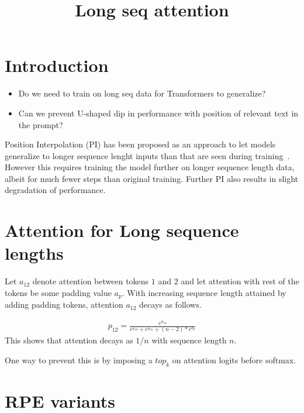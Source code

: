 \title{Long seq attention}



\maketitle

\newcommand{\cy}[1]{\textcolor{red}{ [{\em CY:} #1]}}
\newcommand{\TODO}[1]{\todo[size=\tiny]{#1}}
\newcommand{\todoInline}[1]{{\color{red}{\bf[TODO: #1]}}} 

\todoInline{Metrics for  locality bias?}
\todoInline{Difference between T5Rel and MLPRPE?}
\section{Introduction}

\begin{itemize}
    \item Do we need to train on long seq data for Transformers to generalize?
\item Can we prevent U-shaped dip in performance with position of relevant text in the prompt?
\end{itemize}

Position Interpolation (PI) has been proposed as an approach to let models generalize to longer sequence lenght inputs than that are seen during training~\citep{chen2023extending}. However this requires training the model further on longer sequence length data, albeit for much fewer steps than original training. Further PI also results in slight degradation of performance.

\section{Attention for Long sequence lengths}
Let $a_{12}$ denote attention between tokens $1$ and $2$ and let attention with rest of the tokens be some padding value $a_p$. With increasing sequence length attained by adding padding tokens, attention $a_{12}$ decays as follows.

\begin{align*}
    p_{12} = \frac{e^{a_{12}}}{e^{a_{12}} + e^{a_{21}} + (n-2)*e^{a_{p}}}
\end{align*}
This shows that attention decays as $1/n$ with sequence length $n$.

One way to prevent this is by imposing a $top_k$ on attention logits before softmax.

\section{RPE variants}

